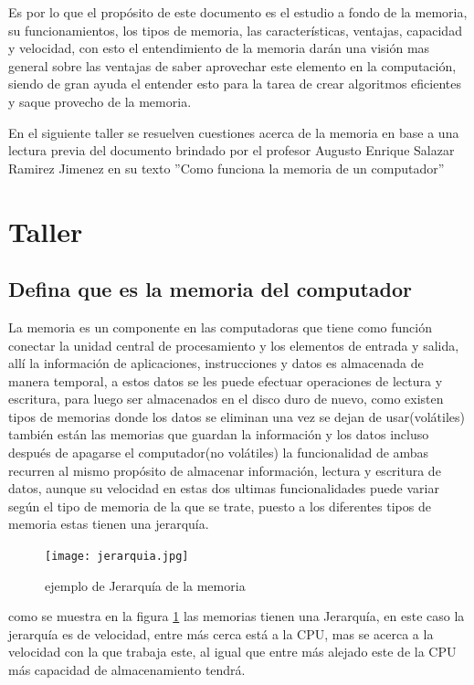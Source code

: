 \documentclass{article}
\begin{document}
Es por lo que el propósito de este documento es el estudio a fondo de la memoria, su funcionamientos, los tipos de memoria, las características, ventajas, capacidad y velocidad, con esto el entendimiento de la memoria darán una visión mas general sobre las ventajas de saber aprovechar este elemento en la computación, siendo de gran ayuda el entender esto para la tarea de crear algoritmos eficientes y saque provecho de la memoria. 
\newline

En el siguiente taller se resuelven cuestiones acerca de la memoria en base a una lectura previa del documento brindado por el profesor Augusto Enrique Salazar Ramirez Jimenez en su texto ''Como funciona la memoria de un computador''
\newpage
\section{Taller}

    \subsection{Defina que es la memoria del computador}
    La memoria es un componente en las computadoras que tiene como función conectar la unidad central de procesamiento y los elementos de entrada y salida, allí  la información de aplicaciones, instrucciones y datos es almacenada de manera temporal, a estos datos se les puede efectuar operaciones de lectura y escritura, para luego ser almacenados en el disco duro de nuevo, como existen tipos de memorias donde los datos se eliminan una vez se dejan de usar(volátiles) también están las memorias que guardan la información y los datos incluso después de apagarse el computador(no volátiles) la funcionalidad de ambas recurren al mismo propósito de almacenar información, lectura y escritura de datos, aunque su velocidad en estas dos ultimas funcionalidades puede variar según el tipo de memoria de la que se trate, puesto a los diferentes tipos de memoria estas tienen una jerarquía. \cite{Mano}
    
        \begin{figure}[h]
        \texttt{[image: jerarquia.jpg]}
        \centering
        \caption{ejemplo de Jerarquía de la memoria}
        \label{fig:Jerarquia}
        \end{figure}   
     
     como se muestra en la figura \ref{fig:Jerarquia} las memorias tienen una Jerarquía, en este caso la jerarquía es de velocidad, entre más cerca está a la CPU, mas se acerca a la velocidad con la que trabaja este, al igual que entre más alejado este de la CPU más capacidad de almacenamiento tendrá.  
        
\end{document}
